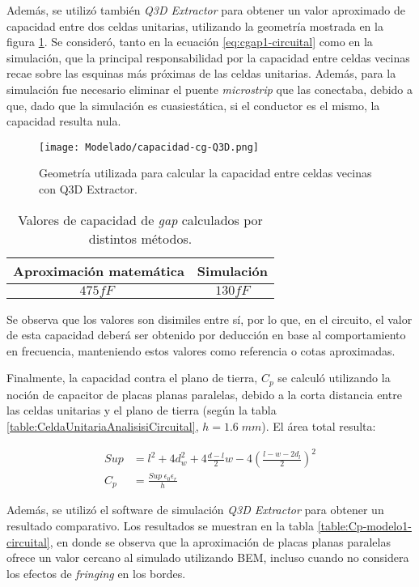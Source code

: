 Además, se utilizó también \textit{Q3D Extractor} para obtener un valor aproximado de capacidad entre dos celdas unitarias, utilizando la geometría mostrada en la figura \ref{fig:capacidad-cg-Q3D}. Se consideró, tanto en la ecuación \ref{eq:cgap1-circuital} como en la simulación, que la principal responsabilidad por la capacidad entre celdas vecinas recae sobre las esquinas más próximas de las celdas unitarias. Además, para la simulación fue necesario eliminar el puente \textit{microstrip} que las conectaba, debido a que, dado que la simulación es cuasiestática, si el conductor es el mismo, la capacidad resulta nula.

\begin{figure}[h]
	\centering
	\texttt{[image: Modelado/capacidad-cg-Q3D.png]}
	\caption{Geometría utilizada para calcular la capacidad entre celdas vecinas con Q3D Extractor.}
	\label{fig:capacidad-cg-Q3D}
\end{figure}

\begin{table}
	\centering
	\begin{tabular}{|c|c|}
		\hline 
		Aproximación matemática & Simulación \\ 
		\hline 
		$475 fF\;$ & $130 fF$\\ 
		\hline 
	\end{tabular}
	\caption{Valores de capacidad de \textit{gap} calculados por distintos métodos.}
	\label{table:Cg}
\end{table}

Se observa que los valores son disimiles entre sí, por lo que, en el circuito, el valor de esta capacidad deberá ser obtenido por deducción en base al comportamiento en frecuencia, manteniendo estos valores como referencia o cotas aproximadas.

Finalmente, la capacidad contra el plano de tierra, $C_p$ se calculó utilizando la noción de capacitor de placas planas paralelas, debido a la corta distancia entre las celdas unitarias y el plano de tierra (según la tabla \ref{table:CeldaUnitariaAnalisisiCircuital}, $h=1.6\;mm$). El área total resulta:

\begin{align}
	Sup &= l^2+4 d_w^2+4 \frac{d-l}{2} w - 4 \left(\frac{l-w-2 d_l}{2}\right)^2 \\
	C_{p} &= \frac{Sup\; \epsilon_0 \epsilon_r}{h}
\end{align}

Además, se utilizó el software de simulación \textit{Q3D Extractor} para obtener un resultado comparativo. Los resultados se muestran en la tabla \ref{table:Cp-modelo1-circuital}, en donde se observa que la aproximación de placas planas paralelas ofrece un valor cercano al simulado utilizando BEM, incluso cuando no considera los efectos de \textit{fringing} en los bordes.


